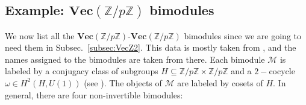 \documentclass[aps,prb,twocolumn,superscriptaddress,noshowkeys]{revtex4-2}  %
\renewcommand{\Vec}{\textbf{Vec}}
\newcommand{\Z}{\mathbb{Z}}
\theoremstyle{plain}%
\theoremstyle{definition}
\theoremstyle{remark}
\begin{document}

\subsection{Example: $\Vec(\Z/p\Z)$ bimodules}\label{sec:VecZp-bimodules}

We now list all the $\Vec(\Z/p\Z)$-$\Vec(\Z/p\Z)$ bimodules since we are going to need them in Subsec.~\ref{subsec:VecZ2}. This data is mostly taken from \cite{BBJ19}, and the names assigned to the bimodules are taken from there. Each bimodule $\mathcal{M}$ is labeled by a conjugacy class of subgroups $H\subseteq\Z/p\Z\times\Z/p\Z$ and a $2-$cocycle $\omega\in H^2(H,U(1))$ (see \cite{Etingof2015}). The objects of $\mathcal{M}$ are labeled by cosets of $H$. In general, there are four non-invertible bimodules: 
\end{document}
